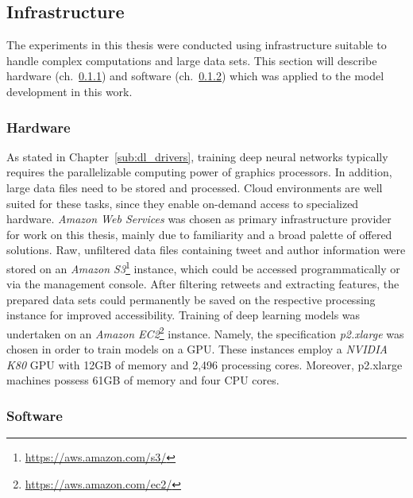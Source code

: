 \subsection{Infrastructure}
\label{sec:infrastructure}

The experiments in this thesis were conducted using infrastructure suitable
to handle complex computations and large data sets.
This section will describe hardware (ch.~\ref{sub:meth_hardware}) and software
(ch.~\ref{sub:meth_software}) which was applied to the model development in this work.

\subsubsection{Hardware}
\label{sub:meth_hardware}

As stated in Chapter~\ref{sub:dl_drivers}, training deep neural networks
typically requires the parallelizable computing power of graphics processors.
In addition, large data files need to be stored and processed.
Cloud environments are well suited for these tasks, since they enable on-demand 
access to specialized hardware.
\textit{Amazon Web Services} was chosen as primary infrastructure provider for 
work on this thesis, mainly due to familiarity and a broad palette of offered
solutions.
Raw, unfiltered data files containing tweet and author information were stored
on an \textit{Amazon S3}\footnote{\url{https://aws.amazon.com/s3/}} instance,
which could be accessed programmatically or via the management console.
After filtering retweets and extracting features, the prepared data sets could
permanently be saved on the respective processing instance for improved
accessibility.
Training of deep learning models was undertaken on an \textit{Amazon EC2}\footnote{\url{https://aws.amazon.com/ec2/}}
instance.
Namely, the specification \textit{p2.xlarge} was chosen in order to train models
on a GPU.
These instances employ a \textit{NVIDIA K80} GPU with 12GB of memory and 2,496
processing cores.
Moreover, p2.xlarge machines possess 61GB of memory and four CPU cores.

\subsubsection{Software}
\label{sub:meth_software}

